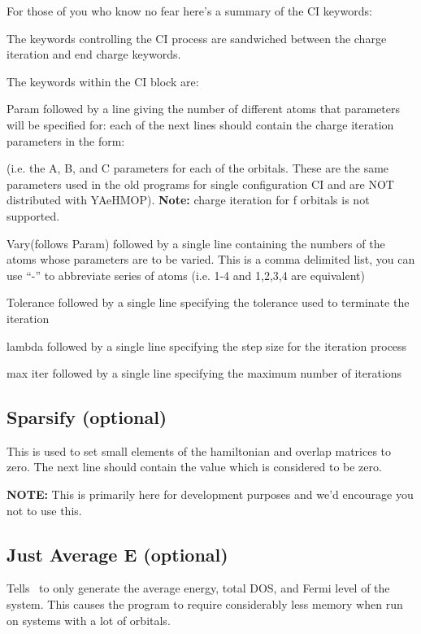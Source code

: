 For those of you who know no fear here's a summary of the CI keywords:

The keywords controlling the CI process are sandwiched between the {\sf charge iteration} and {\sf end charge} keywords.

The keywords within the CI block are: 

{\sf Param}
followed by a line giving the number of different atoms that parameters
will be specified for: 
each of the next  lines should contain the charge
iteration parameters in the form:

(i.e. the A, B, and C parameters for each of the orbitals.  These are
the same parameters used in the old programs for single configuration
CI and are NOT distributed with YAeHMOP).
{\bf Note:} charge iteration for f orbitals is not supported.

{\sf Vary}(follows Param)
followed by a single line containing the numbers of the atoms
whose parameters are to be varied. This is a comma delimited list, you
can use ``-'' to abbreviate series of atoms (i.e. 1-4 and 1,2,3,4 are
equivalent)

{\sf Tolerance}
followed by a single line specifying the tolerance used to terminate the iteration

{\sf lambda}
followed by a single line specifying the step size for the iteration process

{\sf max iter}
followed by a single line specifying the maximum number of iterations


\subsection{{\sf Sparsify} (optional)}

This is used to set small elements of the hamiltonian and overlap
matrices to zero.  
The next line should contain the value which is considered to be zero.

{\bf NOTE:} This is primarily here for development purposes and 
we'd encourage you not to use this.

\subsection{{\sf Just Average E} (optional)}

Tells \calcprog\ to only generate the average energy, total DOS, and
Fermi level of
the system.  This causes the program to require considerably less
memory when run on systems with a lot of orbitals.

